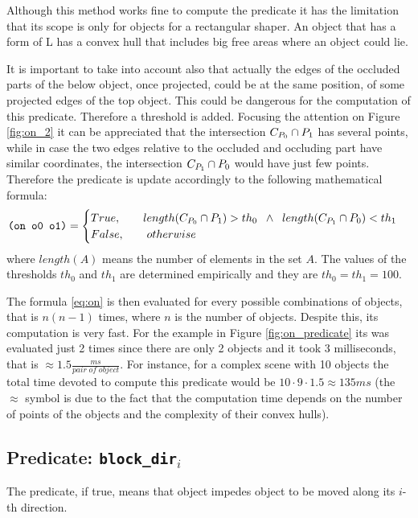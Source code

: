 Although this method works fine to compute the  predicate it has the limitation that its scope is only for objects for a rectangular shaper. An object that has a form of L has a convex hull that includes big free areas where an object could lie. 

It is important to take into account also that actually the edges of the occluded parts of the below object, once projected, could be at the same position, of some projected edges of the top object. This could be dangerous for the computation of this predicate. Therefore a threshold is added. Focusing the attention on Figure \ref{fig:on_2} it can be appreciated that the intersection ${\sc C_{P_{0}}} \cap {\sc P_{1}}$ has several points, while in case the two edges relative to the occluded and occluding part have similar coordinates, the intersection ${\sc C_{P_{1}}} \cap {\sc P_{0}}$ would have just few points. Therefore the  predicate is update accordingly to the following mathematical formula:
\begin{equation}
\texttt{(on o0 o1)} =
\begin{cases}
{\sc True}, \qquad length({\sc C_{P_{0}}} \cap {\sc P_{1}}) > th_0 \;\; \wedge \;\; length({\sc C_{P_{1}}} \cap {\sc P_{0}}) < th_1 \\
{\sc False}, \qquad otherwise
\end{cases}
\label{eq:on}
\end{equation}
where $length(A)$ means the number of elements in the set $A$.
The values of the thresholds $th_0$ and $th_1$ are determined empirically and they are $th_0=th_1=100$.

The formula \ref{eq:on} is then evaluated for every possible combinations of objects, that is $n(n-1)$ times, where $n$ is the number of objects. Despite this, its computation is very fast. For the example in Figure \ref{fig:on_predicate} its was evaluated just 2 times since there are only 2 objects and it took $3$ milliseconds, that is $\approx 1.5 \frac{ms}{pair \; of \; object}$. For instance, for a complex scene with 10 objects the total time devoted to compute this predicate would be $10 \cdot 9 \cdot 1.5 \approx 135 ms$ (the $\approx$ symbol is due to the fact that the computation time depends on the number of points of the objects and the complexity of their convex hulls).



\subsection{Predicate: \texttt{block\_dir$_i$}}
The  predicate, if true, means that object  impedes object  to be moved along its $i$-th direction. 

